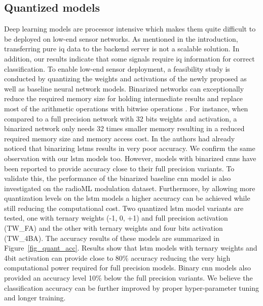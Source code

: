 \subsection{Quantized models}
Deep learning models are processor intensive which makes them quite difficult to be deployed on low-end sensor networks. As mentioned in the introduction, transferring pure \ac{iq} data to the backend server is not a scalable solution. In addition, our results indicate that some signals require \ac{iq} information for correct classification. To enable low-end sensor deployment, a feasibility study is conducted by quantizing the weights and activations of the newly proposed as well as baseline neural network models. Binarized networks can exceptionally reduce the required memory size for holding intermediate results and replace most of the arithmetic operations with bitwise operations \cite{quant_neural}. For instance, when compared to a full precision network with 32 bits weights and activation, a binarized network only needs 32 times smaller memory resulting in a reduced required memory size and memory access cost. In \cite{quant_neural} the authors had already noticed that binarizing \ac{lstm}s results in very poor accuracy. We confirm the same observation with our \ac{lstm} models too. However, models with binarized \ac{cnn}s have been reported to provide accuracy close to their full precision variants. To validate this, the performance of the binarized baseline \ac{cnn} model is also investigated on the radioML modulation dataset. Furthermore, by allowing more quantization levels on the \ac{lstm} models a higher accuracy can be achieved while still reducing the computational cost. Two quantized \ac{lstm} model variants are tested, one with ternary weights (-1, 0, +1) and full precision activation (TW\_FA) and the other with ternary weights and four bits activation (TW\_4BA). The accuracy results of these models are summarized in Figure~\ref{fig_quant_acc}. Results show that \ac{lstm} models with ternary weights and 4bit activation can provide close to 80\% accuracy reducing the very high computational power required for full precision models. Binary \ac{cnn} models also provided an accuracy level 10\% below the full precision variants. We believe the classification accuracy can be further improved by proper hyper-parameter tuning and longer training.

